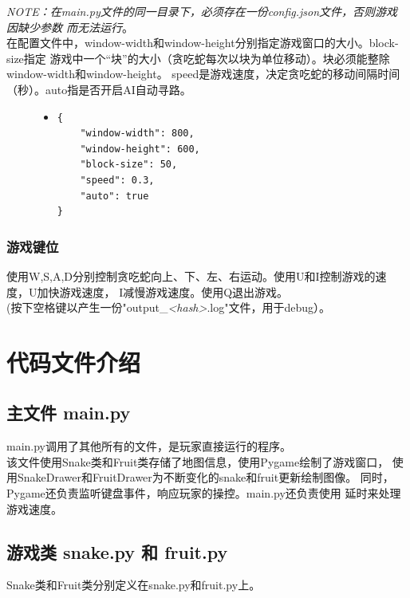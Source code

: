 \documentclass[a4paper]{article}
\begin{document}
\emph{NOTE：在main.py文件的同一目录下，必须存在一份config.json文件，否则游戏因缺少参数
而无法运行}。\\

在配置文件中，window-width和window-height分别指定游戏窗口的大小。block-size指定
游戏中一个``块''的大小（贪吃蛇每次以块为单位移动）。块必须能整除window-width和window-height。
speed是游戏速度，决定贪吃蛇的移动间隔时间（秒）。auto指是否开启AI自动寻路。

\begin{figure}[!hbt]
\begin{itemize}
\item[] \begin{lstlisting}[style=mypython, label=lst:config, caption=config.json配置文件（默认）]
{
    "window-width": 800,
    "window-height": 600,
    "block-size": 50,
    "speed": 0.3,
    "auto": true
}
\end{lstlisting}
\end{itemize}
\end{figure}

\subsubsection{游戏键位}
使用W,S,A,D分别控制贪吃蛇向上、下、左、右运动。使用U和I控制游戏的速度，U加快游戏速度，
I减慢游戏速度。使用Q退出游戏。\\

(按下空格键以产生一份"output\_\emph{<hash>}.log"文件，用于debug）。

\section{代码文件介绍}
\subsection{主文件 main.py}
main.py调用了其他所有的文件，是玩家直接运行的程序。\\

该文件使用Snake类和Fruit类存储了地图信息，使用Pygame绘制了游戏窗口，
使用SnakeDrawer和FruitDrawer为不断变化的snake和fruit更新绘制图像。
同时，Pygame还负责监听键盘事件，响应玩家的操控。main.py还负责使用
延时来处理游戏速度。
\subsection{游戏类 snake.py 和 fruit.py}
Snake类和Fruit类分别定义在snake.py和fruit.py上。\\
\end{document}
